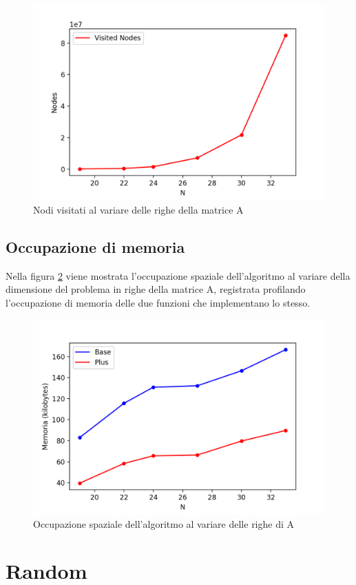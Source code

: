\begin{figure}[h!]
\centering
\includegraphics[width=0.8\linewidth]{figures/sudoku/s3_row_visited.png}
\caption{Nodi visitati al variare delle righe della matrice A}
\label{row:visited}
\end{figure}

\newpage{}

\subsection{Occupazione di memoria}
Nella figura \ref{row:mem} viene mostrata l'occupazione spaziale dell'algoritmo al variare della dimensione del problema in righe della matrice A, registrata profilando l'occupazione di memoria delle due funzioni che implementano lo stesso.

\begin{figure}[h!]
\centering
\includegraphics[width=0.8\linewidth]{figures/sudoku/s3_n_mem.png}
\caption{Occupazione spaziale dell'algoritmo al variare delle righe di A}
\label{row:mem}
\end{figure}


\newpage
\section{Random}

